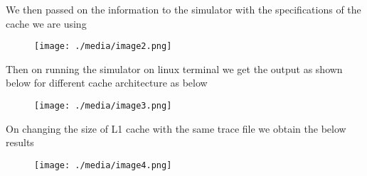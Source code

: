 \documentclass[12pt]{article}
\begin{document}
\par

{\fontsize{14pt}{16.8pt}\selectfont We then passed on the information to the simulator with the specifications of the cache we are using\par}\par




\begin{figure}[H]
	\begin{Center}
		\texttt{[image: ./media/image2.png]}
	\end{Center}
\end{figure}



\par

{\fontsize{14pt}{16.8pt}\selectfont Then on running the simulator on linux terminal we get the output as shown below for different cache architecture as below\par}\par




\begin{figure}[H]
	\begin{Center}
		\texttt{[image: ./media/image3.png]}
	\end{Center}
\end{figure}



\par

{\fontsize{14pt}{16.8pt}\selectfont On changing the size of L1 cache with the same trace file we obtain the below results\par}\par




\begin{figure}[H]
	\begin{Center}
		\texttt{[image: ./media/image4.png]}
	\end{Center}
\end{figure}
\end{document}
